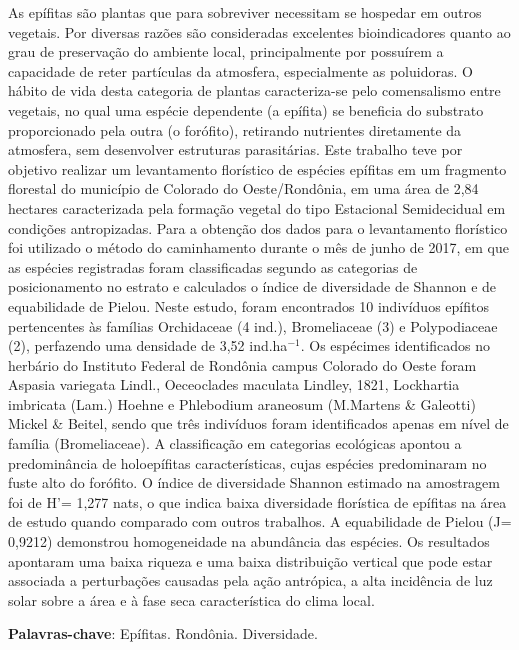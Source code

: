 \documentclass[article,12pt,onesidea,4paper,english,brazil]{abntex2}
\begin{document}
	\noindent As epífitas são plantas que para sobreviver necessitam se hospedar em outros
	vegetais. Por diversas razões são consideradas excelentes bioindicadores quanto ao
	grau de preservação do ambiente local, principalmente por possuírem a capacidade
	de reter partículas da atmosfera, especialmente as poluidoras. O hábito de vida
	desta categoria de plantas caracteriza-se pelo comensalismo entre vegetais, no qual
	uma espécie dependente (a epífita) se beneficia do substrato proporcionado pela
	outra (o forófito), retirando nutrientes diretamente da atmosfera, sem desenvolver
	estruturas parasitárias. Este trabalho teve por objetivo realizar um levantamento
	florístico de espécies epífitas em um fragmento florestal do município de Colorado
	do Oeste/Rondônia, em uma área de 2,84 hectares caracterizada pela formação
	vegetal do tipo Estacional Semidecidual em condições antropizadas. Para a
	obtenção dos dados para o levantamento florístico foi utilizado o método do
	caminhamento durante o mês de junho de 2017, em que as espécies registradas
	foram classificadas segundo as categorias de posicionamento no estrato e
	calculados o índice de diversidade de Shannon e de equabilidade de Pielou. Neste
	estudo, foram encontrados 10 indivíduos epífitos pertencentes às famílias
	Orchidaceae (4 ind.), Bromeliaceae (3) e Polypodiaceae (2), perfazendo uma
	densidade de 3,52 ind.ha$^{-1}$. Os espécimes identificados no herbário do Instituto
	Federal de Rondônia campus Colorado do Oeste foram Aspasia variegata Lindl.,
	Oeceoclades maculata Lindley, 1821, Lockhartia imbricata (Lam.) Hoehne e
	Phlebodium araneosum (M.Martens \& Galeotti) Mickel \& Beitel, sendo que três
	indivíduos foram identificados apenas em nível de família (Bromeliaceae). A
	classificação em categorias ecológicas apontou a predominância de holoepífitas
	características, cujas espécies predominaram no fuste alto do forófito. O índice de
	diversidade Shannon estimado na amostragem foi de H’= 1,277 nats, o que indica
	baixa diversidade florística de epífitas na área de estudo quando comparado com
	outros trabalhos. A equabilidade de Pielou (J= 0,9212) demonstrou homogeneidade
	na abundância das espécies. Os resultados apontaram uma baixa riqueza e uma
	baixa distribuição vertical que pode estar associada a perturbações causadas pela
	ação antrópica, a alta incidência de luz solar sobre a área e à fase seca
	característica do clima local.
	
	\vspace{\onelineskip}
	
	\noindent
	\textbf{Palavras-chave}: Epífitas. Rondônia. Diversidade.
	
\end{document}
